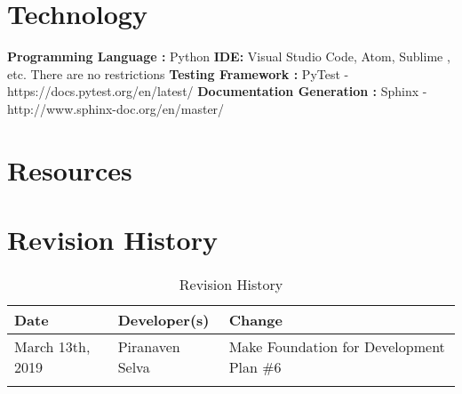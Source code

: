 \documentclass{article}
\begin{document}
\section{Technology}

\textbf{Programming Language :} Python \newline
\textbf{IDE:}  Visual Studio Code, Atom, Sublime , etc. There are no restrictions\newline 
\textbf{Testing Framework :} PyTest  - https://docs.pytest.org/en/latest/ \newline
\textbf{Documentation Generation :} Sphinx - http://www.sphinx-doc.org/en/master/ \newline 



\section{Resources}


\newpage
\section{Revision History}
\begin{table}[hp]
\caption{Revision History} \label{TblRevisionHistory}
\begin{tabularx}{\textwidth}{llX}
\toprule
\textbf{Date} & \textbf{Developer(s)} & \textbf{Change}\\
\midrule
March 13th, 2019 &Piranaven Selva & Make Foundation for Development Plan \#6 \\
\\
\bottomrule
\end{tabularx}
\end{table}
\end{document}
